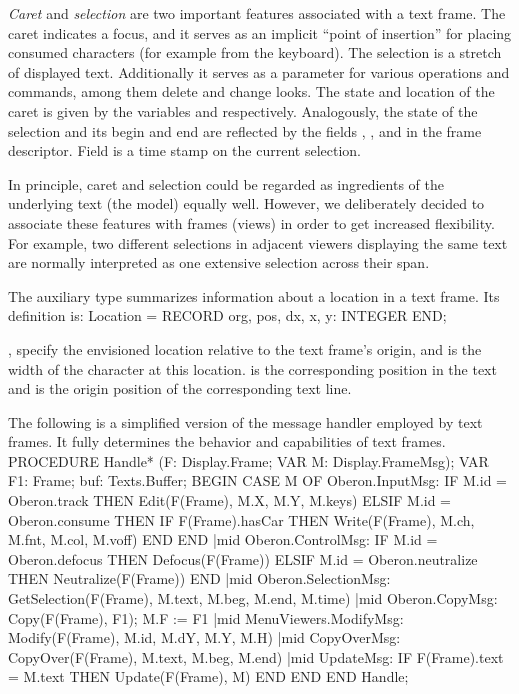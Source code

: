 \emph{Caret} and \emph{selection} are two important features associated with a text frame. The caret indicates a focus, and it serves as an implicit ``point of insertion'' for placing consumed characters (for example from the keyboard). The selection is a stretch of displayed text. Additionally it serves as a parameter for various operations and commands, among them delete and change looks. The state and location of the caret is given by the variables  and  respectively. Analogously, the state of the selection and its begin and end are reflected by the fields , , and  in the frame descriptor. Field  is a time stamp on the current selection.

In principle, caret and selection could be regarded as ingredients of the underlying text (the model) equally well. However, we deliberately decided to associate these features with frames (views) in order to get increased flexibility. For example, two different selections in adjacent viewers displaying the same text are normally interpreted as one extensive selection across their span.

The auxiliary type  summarizes information about a location in a text frame. Its definition is:
\begintt
Location = RECORD
  org, pos, dx, x, y: INTEGER
END;
\endtt

\noindent {},  specify the envisioned location relative to the text frame's origin, and  is the width of the character at this location.  is the corresponding position in the text and  is the origin position of the corresponding text line.

The following is a simplified version of the message handler employed by text frames. It fully determines the behavior and capabilities of text frames.
\begintt
PROCEDURE Handle* (F: Display.Frame; VAR M: Display.FrameMsg);
  VAR F1: Frame;
  buf: Texts.Buffer;
BEGIN
  CASE M OF
  Oberon.InputMsg:
    IF M.id = Oberon.track THEN Edit(F(Frame), M.X, M.Y, M.keys)
    ELSIF M.id = Oberon.consume THEN
    IF F(Frame).hasCar THEN Write(F(Frame), M.ch, M.fnt, M.col, M.voff)
    END END |mid
  Oberon.ControlMsg:
    IF M.id = Oberon.defocus THEN Defocus(F(Frame))
    ELSIF M.id = Oberon.neutralize THEN Neutralize(F(Frame)) END |mid
  Oberon.SelectionMsg:
    GetSelection(F(Frame), M.text, M.beg, M.end, M.time) |mid
  Oberon.CopyMsg:
    Copy(F(Frame), F1); M.F := F1 |mid
  MenuViewers.ModifyMsg:
    Modify(F(Frame), M.id, M.dY, M.Y, M.H) |mid
  CopyOverMsg:
    CopyOver(F(Frame), M.text, M.beg, M.end) |mid
  UpdateMsg:
    IF F(Frame).text = M.text THEN Update(F(Frame), M) END
  END
END Handle;
\endtt

